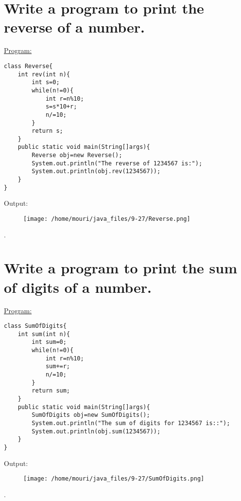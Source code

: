 \documentclass[a4paper,11pt]{article}
\begin{document}
\section{Write a program to print the reverse of a number.}
\underline{Program:}
\begin{lstlisting}[showstringspaces=false]
class Reverse{
	int rev(int n){
		int s=0;
		while(n!=0){
			int r=n%10;
			s=s*10+r;
			n/=10;
		}
		return s;
	}
	public static void main(String[]args){
		Reverse obj=new Reverse();
		System.out.println("The reverse of 1234567 is:");
		System.out.println(obj.rev(1234567));
	}
}
\end{lstlisting}
Output:
\begin{figure}[H]
\centering
\texttt{[image: /home/mouri/java\_files/9-27/Reverse.png]}
\end{figure}
.


\section{Write a program to print the sum of digits of a number.}
\underline{Program:}
\begin{lstlisting}[showstringspaces=false]
class SumOfDigits{
	int sum(int n){
		int sum=0;
		while(n!=0){
			int r=n%10;
			sum+=r;
			n/=10;
		}
		return sum;
	}
	public static void main(String[]args){
		SumOfDigits obj=new SumOfDigits();
		System.out.println("The sum of digits for 1234567 is::");
		System.out.println(obj.sum(1234567));
	}
}
\end{lstlisting}
Output:
\begin{figure}[H]
\centering
\texttt{[image: /home/mouri/java\_files/9-27/SumOfDigits.png]}
\end{figure}
.
\end{document}
